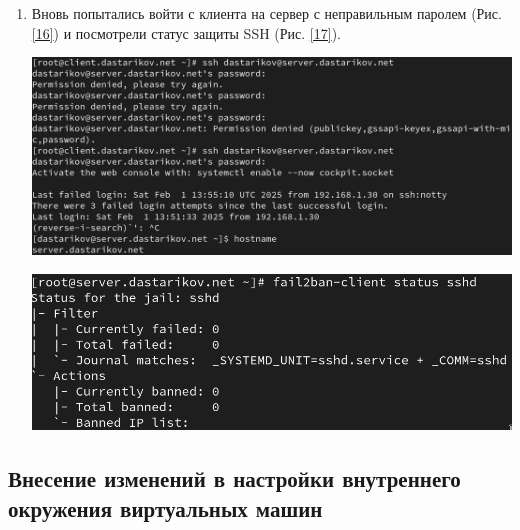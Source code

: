 \begin{enumerate}
\item Вновь попытались войти с клиента на сервер с неправильным паролем (Рис. \ref{16}) и посмотрели статус защиты SSH (Рис. \ref{17}).

  \begin{center}
    \centering
    \includegraphics[width=\textwidth]{../images/image16.png}
    \label{16}
  \end{center}

  \begin{center}
    \centering
    \includegraphics[width=\textwidth]{../images/image17.png}
    \label{17}
  \end{center}

\end{enumerate}
\subsection{Внесение изменений в настройки внутреннего окружения виртуальных машин}


